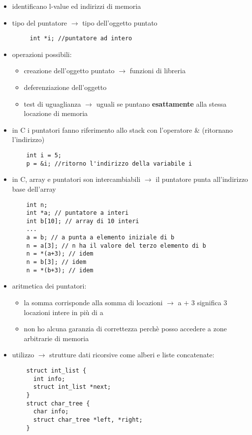 \documentclass[12pt]{extarticle}
\begin{document}
\begin{flushleft}
\begin{itemize}
  \item identificano l-value ed indirizzi di memoria
  \item tipo del puntatore $\rightarrow$ tipo dell'oggetto puntato 
  \begin{lstlisting}
     int *i; //puntatore ad intero
  \end{lstlisting}
  \item operazioni possibili: 
  \begin{itemize}
    \item creazione dell'oggetto puntato $\rightarrow$ funzioni di libreria
    \item deferenziazione dell'oggetto
    \item test di uguaglianza $\rightarrow$ uguali se puntano \textbf{esattamente} alla stessa locazione di memoria
  \end{itemize}
  \item in C i puntatori fanno riferimento allo stack con l'operatore \& (ritornano l'indirizzo)
  \begin{lstlisting}
    int i = 5;
    p = &i; //ritorno l'indirizzo della variabile i
  \end{lstlisting}
  \item in C, array e puntatori son intercambiabili $\rightarrow$ il puntatore punta all'indirizzo base dell'array
  \begin{lstlisting}
    int n;
    int *a; // puntatore a interi
    int b[10]; // array di 10 interi
    ...
    a = b; // a punta a elemento iniziale di b
    n = a[3]; // n ha il valore del terzo elemento di b
    n = *(a+3); // idem
    n = b[3]; // idem
    n = *(b+3); // idem
  \end{lstlisting}
  \item aritmetica dei puntatori:
  \begin{itemize}
    \item la somma corrisponde alla somma di locazioni  $\rightarrow$  a $+$ 3 significa 3 locazioni intere in più di a
    \item non ho alcuna garanzia di correttezza perchè posso accedere a zone arbitrarie di memoria
  \end{itemize}
  
  \newpage
  
  \item utilizzo  $\rightarrow$  strutture dati ricorsive come alberi e liste concatenate:
  \begin{lstlisting}
    struct int_list {
      int info;
      struct int_list *next;
    }
    struct char_tree {     
      char info;
      struct char_tree *left, *right;
    }
  \end{lstlisting}


\end{itemize}
\end{flushleft}
\end{document}
